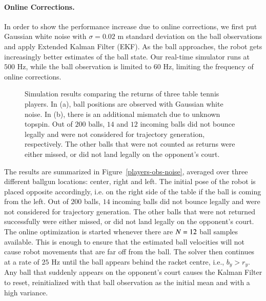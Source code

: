\paragraph{\textbf{Online Corrections}.} In order to show the performance increase due to online corrections, we first put Gaussian white noise with $\sigma = 0.02 $ m standard deviation on the ball observations and apply Extended Kalman Filter (EKF). As the ball approaches, the robot gets increasingly better estimates of the ball state. Our real-time simulator runs at $500$ Hz, while the ball observation is limited to $60$ Hz, limiting the frequency of online corrections.
%
\begin{figure}[t]
	\setlength\figureheight{3cm}
	\hfill%
	\caption{Simulation results comparing the returns of three table tennis players. In (a), ball positions are observed with Gaussian white noise. In (b), there is an additional mismatch due to unknown topspin. Out of $200$ balls, $14$ and $12$ incoming balls did not bounce legally and were not considered for trajectory generation, respectively. The other balls that were not counted as returns were either missed, or did not land legally on the opponent's court.}
	\label{compare-players-sim}
\end{figure}
%
The results are summarized in Figure~\ref{players-obs-noise}, averaged over three different ballgun locations: center, right and left. The initial pose of the robot is placed opposite accordingly, i.e. on the right side of the table if the ball is coming from the left. Out of $200$ balls, $14$ incoming balls did not bounce legally and were not considered for trajectory generation. The other balls that were not returned successfully were either missed, or did not land legally on the opponent's court. The online optimization is started whenever there are $N = 12$ ball samples available. This is enough to ensure that the estimated ball velocities will not cause robot movements that are far off from the ball. The solver then continues at a rate of $25$ Hz until the ball appears behind the racket centre, i.e., $b_y > r_y$. Any ball that suddenly appears on the opponent's court causes the Kalman Filter to reset, reinitialized with that ball observation as the initial mean and with a high variance.

